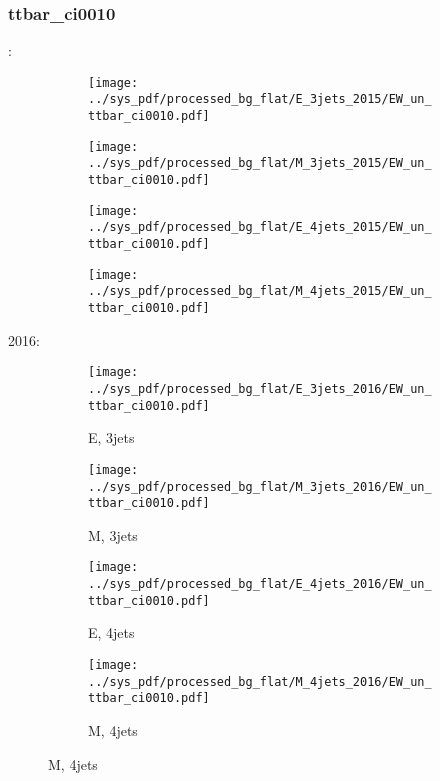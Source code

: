 \documentclass{beamer}
\begin{document}
\begin{frame}
\frametitle{ttbar_ci0010}
\fontsize{5}{1}:
\begin{figure}
\centering
\begin{subfigure}[b]{0.24\textwidth}
\texttt{[image: ../sys\_pdf/processed\_bg\_flat/E\_3jets\_2015/EW\_un\_ttbar\_ci0010.pdf]}
\end{subfigure}
\begin{subfigure}[b]{0.24\textwidth}
\texttt{[image: ../sys\_pdf/processed\_bg\_flat/M\_3jets\_2015/EW\_un\_ttbar\_ci0010.pdf]}
\end{subfigure}
\begin{subfigure}[b]{0.24\textwidth}
\texttt{[image: ../sys\_pdf/processed\_bg\_flat/E\_4jets\_2015/EW\_un\_ttbar\_ci0010.pdf]}
\end{subfigure}
\begin{subfigure}[b]{0.24\textwidth}
\texttt{[image: ../sys\_pdf/processed\_bg\_flat/M\_4jets\_2015/EW\_un\_ttbar\_ci0010.pdf]}
\end{subfigure}
\end{figure}
2016:
\begin{figure}
\centering
\begin{subfigure}[b]{0.24\textwidth}
\texttt{[image: ../sys\_pdf/processed\_bg\_flat/E\_3jets\_2016/EW\_un\_ttbar\_ci0010.pdf]}
\captionsetup{font=tiny}
\caption{E, 3jets}
\end{subfigure}
\begin{subfigure}[b]{0.24\textwidth}
\texttt{[image: ../sys\_pdf/processed\_bg\_flat/M\_3jets\_2016/EW\_un\_ttbar\_ci0010.pdf]}
\captionsetup{font=tiny}
\caption{M, 3jets}
\end{subfigure}
\begin{subfigure}[b]{0.24\textwidth}
\texttt{[image: ../sys\_pdf/processed\_bg\_flat/E\_4jets\_2016/EW\_un\_ttbar\_ci0010.pdf]}
\captionsetup{font=tiny}
\caption{E, 4jets}
\end{subfigure}
\begin{subfigure}[b]{0.24\textwidth}
\texttt{[image: ../sys\_pdf/processed\_bg\_flat/M\_4jets\_2016/EW\_un\_ttbar\_ci0010.pdf]}
\captionsetup{font=tiny}
\caption{M, 4jets}
\end{subfigure}
\end{figure}
\end{frame}
\end{document}
